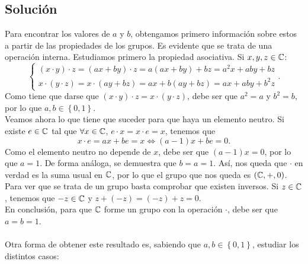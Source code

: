 \documentclass{article}
\begin{document}
\subsection*{Solución}
	Para encontrar los valores de $\displaystyle a $ y $\displaystyle b $, obtengamos primero información sobre estos a partir de las propiedades de los grupos. Es evidente que se trata de una operación interna. Estudiamos primero la propiedad asociativa. Si $\displaystyle x,y,z \in \mathbb{C} $:
	\[
	\begin{cases}
		\left(x \cdot y\right) \cdot z = \left(ax + by\right) \cdot z = a\left(ax+by\right) + bz = a^{2}x + aby + bz \\
		x \cdot \left(y \cdot z\right) = x \cdot \left(ay + bz\right) = ax + b\left(ay + bz\right) = ax + aby + b^{2}z
	\end{cases}
	.\]
	Como tiene que darse que $\displaystyle \left(x \cdot y\right) \cdot z = x \cdot \left(y \cdot z\right) $, debe ser que $\displaystyle a^{2} = a $ y $\displaystyle b^{2} = b $, por lo que $\displaystyle a,b \in \left\{ 0,1\right\}  $. \\
	Veamos ahora lo que tiene que suceder para que haya un elemento neutro. Si existe $\displaystyle e \in \mathbb{C} $ tal que $\displaystyle \forall x \in \mathbb{C} $, $\displaystyle e \cdot x = x \cdot e = x $, tenemos que 
	\[x \cdot e = ax + be = x \iff \left(a-1\right)x + be = 0 .\]
Como el elemento neutro no depende de $\displaystyle x $, debe ser que $\displaystyle \left(a-1\right)x = 0$, por lo que $\displaystyle a = 1 $. De forma análoga, se demuestra que $\displaystyle b = a = 1 $. Así, nos queda que $\displaystyle \cdot  $ en verdad es la suma usual en $\displaystyle \mathbb{C} $, por lo que el grupo que nos queda es $\displaystyle \left(\mathbb{C}, +, 0\right) $. Para ver que se trata de un grupo basta comprobar que existen inversos. Si $\displaystyle z \in \mathbb{C} $, tenemos que $\displaystyle - z \in \mathbb{C} $ y $\displaystyle z + \left(-z\right) = \left(-z\right) + z = 0 $. \\
En conclusión, para que $\displaystyle \mathbb{C} $ forme un grupo con la operación $\displaystyle \cdot  $, debe ser que $\displaystyle a = b = 1 $. \\ \\
Otra forma de obtener este resultado es, sabiendo que $\displaystyle a,b \in \left\{ 0,1\right\}  $, estudiar los distintos casos:
\end{document}
